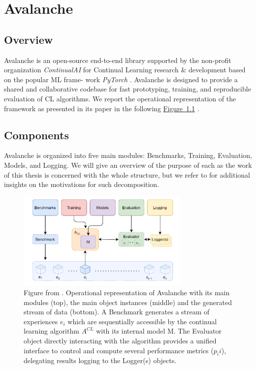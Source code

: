 \documentclass[english, LaM, oneside]{sapthesis}%
\begin{document}
\chapter{Avalanche}
\label{chap5}
\section{Overview}
Avalanche \cite{avalanche} is an open-source end-to-end library supported by the non-profit organization \textit{ContinualAI} for Continual Learning research \& development based on the popular ML frame- work \textit{PyTorch} \cite{pytorch}. Avalanche is designed to provide a shared and collaborative codebase for fast prototyping, training, and reproducible evaluation of CL algorithms. We report the operational representation of the framework as presented in its paper in the following \hyperref[fig:avalanche]{Figure~\ref*{fig:avalanche}} .

\section{Components}
\label{avalanche_compoments}
Avalanche is organized into five main modules: Benchmarks, Training, Evaluation, Models, and Logging. We will give an overview of the purpose of each as the work of this thesis is concerned with the whole structure, but we refer to \cite{avalanche} for additional insights on the motivations for such decomposition.

\begin{figure}[h]
            \centering
            \includegraphics[width=0.75\textwidth]{avalanche.png}
            \caption{Figure from \cite{avalanche}. Operational representation of Avalanche with its main modules (top), the main object instances (middle) and the generated stream of data (bottom). A Benchmark generates a stream of experiences $e_i$ which are sequentially accessible by the continual learning algorithm $A^{CL}$ with its internal model M. The Evaluator object directly interacting with the algorithm provides a unified interface to control and compute several performance metrics ($p_ii$), delegating results logging to the Logger(s) objects.}
            \label{fig:avalanche}
        \end{figure}
        
\end{document}
